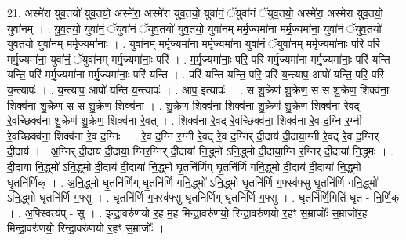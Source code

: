 \documentclass[17pt]{extarticle}
\begin{document}
21. अस्मे॑रा युव॒तयो॑ युव॒तयो॒ अस्मे॑रा॒ अस्मे॑रा युव॒तयो॒ युवा॑नं॒ ॅयुवा॑नं ॅयुव॒तयो॒ अस्मे॑रा॒ अस्मे॑रा युव॒तयो॒ युवा॑नम् । . यु॒व॒तयो॒ युवा॑नं॒ ॅयुवा॑नं ॅयुव॒तयो॑ युव॒तयो॒ युवा॑नम् मर्मृ॒ज्यमा॑ना मर्मृ॒ज्यमा॑ना॒ युवा॑नं ॅयुव॒तयो॑ युव॒तयो॒ युवा॑नम् मर्मृ॒ज्यमा॑नाः । . युवा॑नम् मर्मृ॒ज्यमा॑ना मर्मृ॒ज्यमा॑ना॒ युवा॑नं॒ ॅयुवा॑नम् मर्मृ॒ज्यमा॑नाः॒ परि॒ परि॑ मर्मृ॒ज्यमा॑ना॒ युवा॑नं॒ ॅयुवा॑नम् मर्मृ॒ज्यमा॑नाः॒ परि॑ । . म॒र्मृ॒ज्यमा॑नाः॒ परि॒ परि॑ मर्मृ॒ज्यमा॑ना मर्मृ॒ज्यमा॑नाः॒ परि॑ यन्ति यन्ति॒ परि॑ मर्मृ॒ज्यमा॑ना मर्मृ॒ज्यमा॑नाः॒ परि॑ यन्ति । . परि॑ यन्ति यन्ति॒ परि॒ परि॑ य॒न्त्याप॒ आपो॑ यन्ति॒ परि॒ परि॑ य॒न्त्यापः॑ । . य॒न्त्याप॒ आपो॑ यन्ति य॒न्त्यापः॑ । . आप॒ इत्यापः॑ । . स शु॒क्रेण॑ शु॒क्रेण॒ स स शु॒क्रेण॒ शिक्व॑ना॒ शिक्व॑ना शु॒क्रेण॒ स स शु॒क्रेण॒ शिक्व॑ना । . शु॒क्रेण॒ शिक्व॑ना॒ शिक्व॑ना शु॒क्रेण॑ शु॒क्रेण॒ शिक्व॑ना रे॒वद् रे॒वच्छिक्व॑ना शु॒क्रेण॑ शु॒क्रेण॒ शिक्व॑ना रे॒वत् । . शिक्व॑ना रे॒वद् रे॒वच्छिक्व॑ना॒ शिक्व॑ना रे॒व द॒ग्नि र॒ग्नी रे॒वच्छिक्व॑ना॒ शिक्व॑ना रे॒व द॒ग्निः । . रे॒व द॒ग्नि र॒ग्नी रे॒वद् रे॒व द॒ग्निर् दी॒दाय॑ दी॒दाया॒ग्नी रे॒वद् रे॒व द॒ग्निर् दी॒दाय॑ । . अ॒ग्निर् दी॒दाय॑ दी॒दाया॒ ग्निर॒ग्निर् दी॒दाया॑ नि॒द्ध्मो॑ ऽनि॒द्ध्मो दी॒दाया॒ग्नि र॒ग्निर् दी॒दाया॑ नि॒द्ध्मः । . दी॒दाया॑ नि॒द्ध्मो॑ ऽनि॒द्ध्मो दी॒दाय॑ दी॒दाया॑ नि॒द्ध्मो घृ॒तनि॑र्णिग् घृ॒तनि॑र्णि गनि॒द्ध्मो दी॒दाय॑ दी॒दाया॑ नि॒द्ध्मो घृ॒तनि॑र्णिक् । . अ॒नि॒द्ध्मो घृ॒तनि॑र्णिग् घृ॒तनि॑र्णि गनि॒द्ध्मो॑ ऽनि॒द्ध्मो घृ॒तनि॑र्णि ग॒फ्स्व॑फ्सु घृ॒तनि॑र्णि गनि॒द्ध्मो॑ ऽनि॒द्ध्मो घृ॒तनि॑र्णि ग॒फ्सु । . घृ॒तनि॑र्णि ग॒फ्स्व॑फ्सु घृ॒तनि॑र्णिग् घृ॒तनि॑र्णि ग॒फ्सु । . घृ॒तनि॑र्णि॒गिति॑ घृ॒त - नि॒र्णि॒क् । . अ॒फ्स्वित्य॑प् - सु । . इन्द्रा॒वरु॑णयो र॒ह म॒ह मिन्द्रा॒वरु॑णयो॒ रिन्द्रा॒वरु॑णयो र॒हꣳ स॒म्राजोः᳚ स॒म्राजो॑र॒ह मिन्द्रा॒वरु॑णयो॒ रिन्द्रा॒वरु॑णयो र॒हꣳ स॒म्राजोः᳚ । \newline
\end{document}
